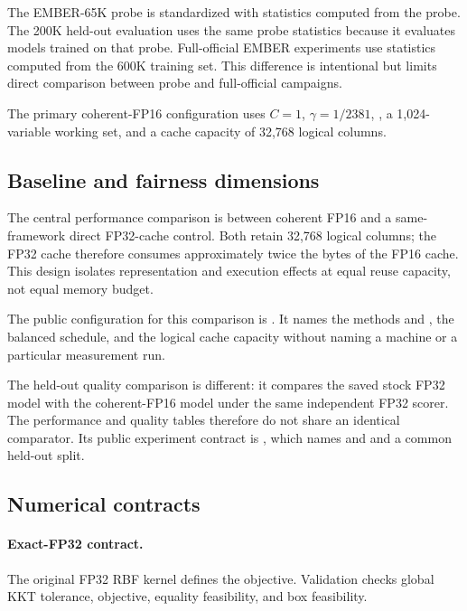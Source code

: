 The EMBER-65K probe is standardized with statistics computed from the probe.
The 200K held-out evaluation uses the same probe statistics because it
evaluates models trained on that probe. Full-official EMBER experiments use
statistics computed from the 600K training set. This difference is intentional
but limits direct comparison between probe and full-official campaigns.

The primary coherent-FP16 configuration uses $C=1$, $\gamma=1/2381$,
, a 1,024-variable working set, and a cache capacity of 32,768
logical columns.

\subsection{Baseline and fairness dimensions}

The central performance comparison is between coherent FP16 and a
same-framework direct FP32-cache control. Both retain 32,768 logical columns;
the FP32 cache therefore consumes approximately twice the bytes of the FP16
cache. This design isolates representation and execution effects at equal
reuse capacity, not equal memory budget.

The public configuration for this comparison is
. It names the methods
 and , the balanced schedule, and the
logical cache capacity without naming a machine or a particular measurement
run.

The held-out quality comparison is different: it compares the saved stock
FP32 model with the coherent-FP16 model under the same independent FP32
scorer. The performance and quality tables therefore do not share an identical
comparator. Its public experiment contract is
, which names
 and  and a common held-out split.

\subsection{Numerical contracts}

\paragraph{Exact-FP32 contract.}
The original FP32 RBF kernel defines the objective. Validation checks global
KKT tolerance, objective, equality feasibility, and box feasibility.

